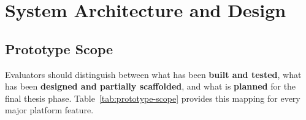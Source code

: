 \documentclass[12pt,a4paper]{report}  %
\begin{document}
\chapter{System Architecture and Design}

\section{Prototype Scope}
\label{sec:prototype-scope}

Evaluators should distinguish between what has been \textbf{built and tested}, what has been \textbf{designed and partially scaffolded}, and what is \textbf{planned} for the final thesis phase. Table~\ref{tab:prototype-scope} provides this mapping for every major platform feature.
\end{document}
